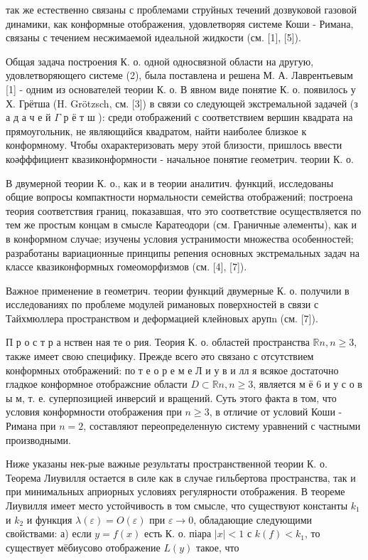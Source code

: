 \documentclass[10pt]{article}
\begin{document}
так же естественно связаны с проблемами струйных течений дозвуковой газовой динамики, как конформные отображения, удовлетворяя системе Коши - Римана, связаны с течением несжимаемой идеальной жидкости (см. [1], [5]).



Общая задача построения К. о. одной односвязной области на другую, удовлетворяющего системе (2), была поставлена и решена М. А. Лаврентьевым [1] - одним из основателей теории К. о. В явном виде понятие К. о. появилось у Х. Грётша (H. Grötzsch, см. [3]) в связи со следующей экстремальной задачей (з а д а ч е й $\Gamma$ р ё т ш ): среди отображений с соответствием вершин квадрата на прямоугольник, не являющийся квадратом, найти наиболее близкое к конформному. Чтобы охарактеризовать меру этой близости, пришлось ввести коәфффициент квазиконформности - начальное понятие геометрич. теории К. о.



В двумерной теории К. о., как и в теории аналитич. функций, исследованы общие вопросы компактности нормальности семейства отображений; построена теория соответствия границ, показавшая, что это соответствие осуществляется по тем же простым концам в смысле Каратеодори (см. Граничные әлементы), как и в конформном случае; изучены условия устранимости множества особенностей; разработаны вариационные принципы репения основных экстремальных задач на классе квазиконформных гомеоморфизмов (см. [4], [7]).



Важное применение в геометрич. теории функций двумерные К. о. получили в исследованиях по проблеме модулей римановых поверхностей в связи с Тайхмюллера пространством и деформацией клейновых арупn (см. [7]).



П р о с т р а нствен ная те о рия. Теория $К$. о. областей пространства $\mathbb{R} n, n \geqslant 3$, также имеет свою специфику. Прежде всего әто связано с отсутствием конформных отображений: по т е о р е м е Л и у в и лл я всякое достаточно гладкое конформное отображсние области $D \subset \mathbb{R} n, n \geqslant 3$, является м ё 6 и у с о в ы м, т. е. суперпозицией инверсий и вращений. Суть этого факта в том, что условия конформности отображения при $n \geqslant 3$, в отличие от условий Коши - Римана при $n=2$, составляют переопределенную систему уравнений с частными производными.



Ниже указаны нек-рые важные результаты пространственной теории К. о. Теорема Лиувилля остается в силе как в случае гильбертова пространства, так и при минимальных априорных условиях регулярности отображения. В теореме Лиувилля имеет место устойчивость в том смысле, что существуют константы $k_{1}$ и $k_{2}$ и функция $\lambda(\varepsilon)=O(\varepsilon)$ при $\varepsilon \rightarrow 0$, обладающие следующими свойствами: а) если $y=f(x)$ есть К. о. піара $|x|<1$ с $k(f)<k_{1}$, то существует мёбиусово отображение $L(y)$ такое, что
\end{document}

